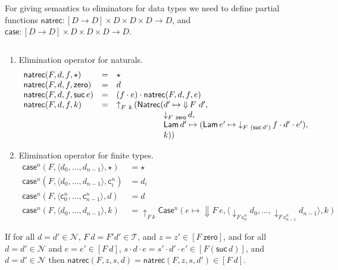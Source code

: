 \documentclass{LMCS}
\theoremstyle{plain}\newtheorem{satz}[thm]{Satz}
\newcommand{\bla}{\ensuremath{\mbox{$$}}}
\newcommand{\into}{\rightarrow}
\newcommand{\ztm}{\mathsf{zero}}
\newcommand{\Da}[1]{\mathop{\Downarrow} #1}
\newcommand{\upa}[2]{\mathop{\uparrow}\nolimits_{#1}{#2}}
\newcommand{\da}[2]{\mathop{\downarrow}\nolimits_{#1}{#2}}
\newcommand{\perT}{\mathcal{T}}
\newcommand{\iLam}[1]{\mathsf{Lam}\,#1}
\newcommand{\dprf}{\star}
\newcommand{\elimraw}{\mathsf{case}}
\newcommand{\Elimraw}{\mathsf{Case}}
\newcommand{\constD}[2]{\mathsf{c}^{#1}_{#2}}
\newcommand{\elimD}[4]{\Elimraw\!^{#1}(#2, #3, #4)}
\newcommand{\tuple}[1]{\langle #1\rangle}
\newcommand{\erecraw}{\elimraw}
\newcommand{\erec}[4]{\erecraw^{#1}(#2,#3,#4)}
\newcommand{\iZero}{\ztm}
\newcommand{\perNat}{\mathcal{N}}
\newcommand{\nrecraw}{\mathsf{natrec}}
\newcommand{\Nrecraw}{\mathsf{Natrec}}
\newcommand{\drec}[4]{\nrecraw(#1,#2,#3,#4)}
\newcommand{\iSuc}[1]{\mathsf{suc}\,#1}
\begin{document}
{\noindent For giving semantics to eliminators for data types we need to define
partial functions $\nrecraw : [D\into D]\times D \times D\times
D\into D$, and $\erecraw : [D\into D]\times D \times D\times
D\into D$.
\begin{defi}[Eliminations on $D$]\bla
  \label{def:recd}
  \begin{enumerate}[(1)]
  \item Elimination operator for naturals.
\[
    \begin{array}{lll}
      \drec{F}{d}{f}{\dprf}   & = & \dprf\\
      \drec{F}{d}{f}{\iZero}   & = & d\\
      \drec{F}{d}{f}{\iSuc{e}} & = & (f\cdot e)\cdot \drec{F}{d}{f}{e}\\
      \drec{F}{d}{f}{k}        & = & 
        \upa{F\ k}(\Nrecraw(
        \begin{array}[t]{@{}l@{}}
          d'\mapsto \Da{F\ d'},\\
          \da{F\ \iZero}{d},   \\
          \iLam{d'\mapsto (\iLam{e' \mapsto  \da{F\ (\iSuc{d'})}{f\cdot
                d' \cdot e'}})}, \\
          k))
    \end{array}
    \end{array}
\]
  \item Elimination operator for finite types.
  \begin{align*}
    \erec{n}{F}{\tuple{d_0,\ldots,d_{n-1}}}{\dprf} &= \dprf\\
    \erec{n}{F}{\tuple{d_0,\ldots,d_{n-1}}}{\constD{n}{i}} &= d_i\\
    \erec{n}{F}{\tuple{\constD n 0,\ldots,\constD n {n-1}}}{d} &= d \\
    \erec{n}{F}{\tuple{d_0,\ldots,d_{n-1}}}{k} &= \upa{F\
      k}{\elimD{n}{e\mapsto \Da{F\ e}} {\tuple{\da{F\
            \constD{n}{0}}{d_0},\ldots,\da{F\
            \constD{n}{n-1}}{d_{n-1}}}}{k}}&
  \end{align*}
\end{enumerate}
\end{defi}

\begin{rem}
  If for all $d=d'\in\perNat$, $F\ d= F' d'\in \perT$, and $z = z'\in
  [F\ \iZero]$, and for all $d=d' \in \perNat$ and $e =e' \in [F\
  d]$, $s\cdot d\cdot e=s'\cdot d'\cdot e' \in [F (\iSuc{d})]$, and $d
  =d' \in \perNat$ then $\drec{F}{z}{s}{d}= \drec{F}{z}{s}{d'} \in [F\
  d]$.
\end{rem}


}
\end{document}
